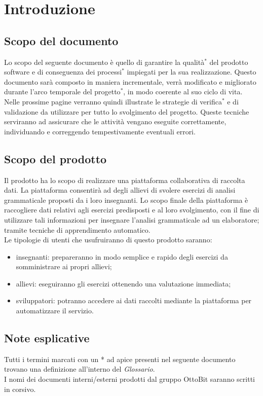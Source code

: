 \section{Introduzione}
\subsection{Scopo del documento}
Lo scopo del seguente documento è quello di garantire la qualità$^*$ del prodotto software e di conseguenza dei processi$^*$ impiegati per la sua realizzazione. Questo documento sarà composto in maniera incrementale, verrà modificato e migliorato durante l'arco temporale del progetto$^*$, in modo coerente al suo ciclo di vita. Nelle prossime pagine verranno quindi illustrate le strategie di verifica$^*$ e di validazione da utilizzare per tutto lo svolgimento del progetto. Queste tecniche serviranno ad assicurare che le attività vengano eseguite correttamente, individuando e correggendo tempestivamente eventuali errori.
\subsection{Scopo del prodotto}
Il prodotto ha lo scopo di realizzare una piattaforma collaborativa di raccolta dati.  La piattaforma consentirà ad degli allievi di svolere esercizi di analisi grammaticale proposti da i loro insegnanti.
Lo scopo finale della piattaforma è raccogliere dati relativi agli esercizi predisposti e al loro svolgimento, con il fine di utilizzare tali informazioni per insegnare l'analisi grammaticale ad un elaboratore; tramite tecniche di apprendimento automatico.\\
Le tipologie di utenti che usufruiranno di questo prodotto saranno:
\begin{itemize}
	\item insegnanti: prepareranno in modo semplice e rapido degli esercizi da somministrare ai propri allievi;
	\item allievi: eseguiranno gli esercizi ottenendo una valutazione immediata;
	\item sviluppatori: potranno accedere ai dati raccolti mediante la piattaforma per automatizzare il servizio.
\end{itemize}
\subsection{Note esplicative}
Tutti i termini marcati con un * ad apice presenti nel seguente documento trovano una definizione all'interno del \textit{Glossario}.\\
I nomi dei documenti interni/esterni prodotti dal gruppo OttoBit saranno scritti in corsivo.
